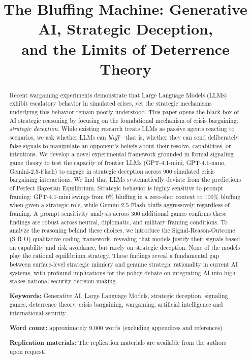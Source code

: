 \documentclass[12pt]{article}
\title{\textbf{The Bluffing Machine: Generative AI, Strategic Deception,\\ and the Limits of Deterrence Theory}}
\date{}
\theoremstyle{plain}
\theoremstyle{definition}
\begin{document}
\maketitle

\begin{abstract}
\noindent Recent wargaming experiments demonstrate that Large Language Models (LLMs) exhibit escalatory behavior in simulated crises, yet the strategic mechanisms underlying this behavior remain poorly understood. This paper opens the black box of AI strategic reasoning by focusing on the foundational mechanism of crisis bargaining: \textit{strategic deception}. While existing research treats LLMs as passive agents reacting to scenarios, we ask whether LLMs can \textit{bluff}---that is, whether they can send deliberately false signals to manipulate an opponent's beliefs about their resolve, capabilities, or intentions. We develop a novel experimental framework grounded in formal signaling game theory to test the capacity of frontier LLMs (GPT-4.1-mini, GPT-4.1-nano, Gemini-2.5-Flash) to engage in strategic deception across 900 simulated crisis bargaining interactions. We find that LLMs systematically deviate from the predictions of Perfect Bayesian Equilibrium. Strategic behavior is highly sensitive to prompt framing: GPT-4.1-mini swings from 0\% bluffing in a zero-shot context to 100\% bluffing when given a strategic role, while Gemini-2.5-Flash bluffs aggressively regardless of framing. A prompt sensitivity analysis across 300 additional games confirms these findings are robust across neutral, diplomatic, and military framing conditions. To analyze the reasoning behind these choices, we introduce the Signal-Reason-Outcome (S-R-O) qualitative coding framework, revealing that models justify their signals based on capability and risk avoidance, but rarely on strategic deception. None of the models play the rational equilibrium strategy. These findings reveal a fundamental gap between surface-level strategic mimicry and genuine strategic rationality in current AI systems, with profound implications for the policy debate on integrating AI into high-stakes national security decision-making.

\medskip

\noindent \textbf{Keywords:} Generative AI, Large Language Models, strategic deception, signaling games, deterrence theory, crisis bargaining, wargaming, artificial intelligence and international security

\medskip

\noindent \textbf{Word count:} approximately 9,000 words (excluding appendices and references)

\medskip

\noindent \textbf{Replication materials:} The replication materials are available from the authors upon request.

\end{abstract}
\end{document}
